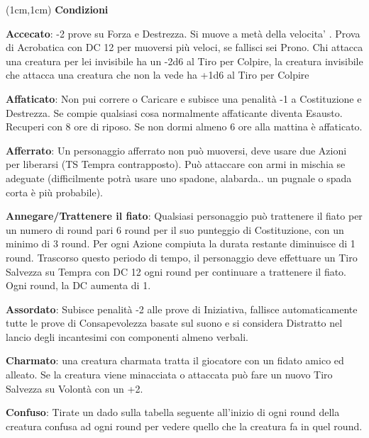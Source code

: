 \documentclass[a4paper,12 pt,openany]{book}
\begin{document}
	\center
	
	\begin{textblock*}{19 cm}(1cm,1cm) %
		\flushleft
		\textbf{Condizioni}\\
		\footnotesize 	
		
		\begin{multicols}{2}
			
\textbf{Accecato}: -2 prove su Forza e Destrezza. 
Si muove a metà della velocita' . Prova di Acrobatica con DC 12 per muoversi più veloci, se fallisci sei Prono.
Chi attacca una creatura per lei invisibile ha un -2d6 al Tiro per Colpire, la creatura invisibile che attacca una creatura che non la vede ha +1d6 al Tiro per Colpire

			
\textbf{Affaticato}: Non pui correre o Caricare e subisce una penalità -1 a Costituzione e Destrezza. Se compie qualsiasi cosa normalmente affaticante diventa Esausto.
Recuperi con 8 ore di riposo. Se non dormi almeno 6 ore alla mattina è affaticato.
			
\textbf{Afferrato}: Un personaggio afferrato non può muoversi, deve usare due Azioni per liberarsi (TS Tempra contrapposto). Può attaccare con armi in mischia se adeguate (difficilmente potrà usare uno spadone, alabarda.. un pugnale o spada corta è più probabile).

\textbf{Annegare/Trattenere il fiato}:  Qualsiasi personaggio può trattenere il fiato per un numero di round pari 6 round per il suo punteggio di Costituzione, con un minimo di 3 round. Per ogni Azione compiuta la durata restante diminuisce di 1 round. Trascorso questo periodo di tempo, il personaggio deve effettuare un Tiro Salvezza su Tempra con DC 12 ogni round per continuare a trattenere il fiato. Ogni round, la DC aumenta di 1.

			
\textbf{Assordato}: Subisce penalità -2 alle prove di Iniziativa, fallisce automaticamente tutte le prove di Consapevolezza basate sul suono e si considera Distratto nel lancio degli incantesimi con componenti almeno verbali.
			
\textbf{Charmato}: una creatura charmata tratta il giocatore con un fidato amico ed alleato. Se la creatura viene minacciata o attaccata può fare un nuovo Tiro Salvezza su Volontà con un +2.
			
\textbf{Confuso}:  Tirate un dado sulla tabella seguente all'inizio di ogni round della creatura confusa ad ogni round per vedere quello che la creatura fa in quel round.
			

\end{multicols}
\end{textblock*}
\end{document}
